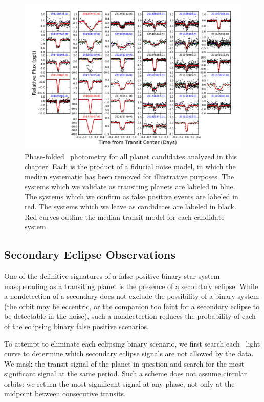 \begin{figure}[htbp]
\centerline{\includegraphics[width=1.0\textwidth]{chapter7/f2.pdf}}
\caption[Phase-folded \KT\ photometry for all planet candidates analyzed in
this chapter]{Phase-folded \KT\ photometry for all planet candidates analyzed in
this chapter.
Each is the product of a fiducial noise model, in which the median systematic
has been removed for illustrative purposes.
The systems which we validate as transiting planets are labeled in
blue.
The systems which we confirm as false positive events are labeled in red.
The systems which we leave as candidates are labeled in black.
Red curves outline the median transit model for each candidate system.
}
\label{fig:transits}
\end{figure}

\subsection{Secondary Eclipse Observations}
\label{sec:sec}
One of the definitive signatures of a false positive binary star system masquerading
as a transiting planet is the presence of a secondary eclipse. While a nondetection of a secondary
does not exclude the possibility of a binary system (the orbit may be eccentric,
or the companion too faint for a secondary eclipse to be detectable in the noise),
such a nondectection reduces the probability of each of the eclipsing binary false
positive scenarios.

To attempt to eliminate each eclipsing binary scenario, we first search each \KT\
light curve to determine which secondary eclipse signals are not allowed by the data.
We mask the transit signal of the planet in question and search for the most significant
signal at the same period.
Such a scheme does not assume circular orbits: we return the most significant signal
at any phase, not only at the midpoint between consecutive transits.

